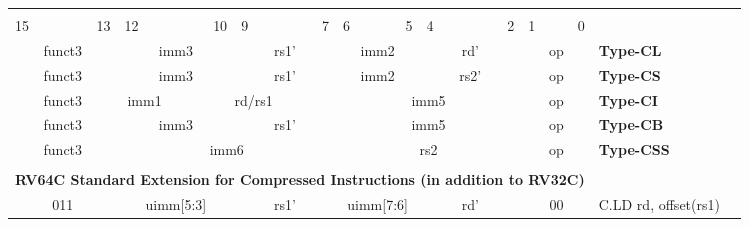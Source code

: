 \documentclass{report}
\begin{document}
\begin{table}[p]
\begin{small}
\begin{center}
\begin{tabular}{p{0.05mm}p{0.05mm}p{0.05mm}p{0.05mm}p{0.05mm}p{0.05mm}p{0.05mm}p{0.05mm}p{0.05mm}p{0.05mm}p{0.05mm}p{0.05mm}p{0.05mm}p{0.05mm}p{0.05mm}p{0.05mm}p{0.05mm}p{0.05mm}p{0.05mm}p{0.05mm}p{0.05mm}p{0.05mm}p{0.05mm}p{0.05mm}p{0.05mm}p{0.05mm}p{0.05mm}p{0.05mm}p{0.05mm}p{0.05mm}p{0.05mm}p{0.05mm}p{50mm}l}& & & & & & & & & & & & & & & & & & & & & & & & & & & & & & & & & \\
\multicolumn{1}{l}{\scriptsize{15}} & \multicolumn{5}{r}{\scriptsize{13}} & \multicolumn{1}{l}{\scriptsize{12}} & \multicolumn{5}{r}{\scriptsize{10}} & \multicolumn{1}{l}{\scriptsize{9}} & \multicolumn{5}{r}{\scriptsize{7}} & \multicolumn{1}{l}{\scriptsize{6}} & \multicolumn{3}{r}{\scriptsize{5}} & \multicolumn{1}{l}{\scriptsize{4}} & \multicolumn{5}{r}{\scriptsize{2}} & \multicolumn{1}{l}{\scriptsize{1}} & \multicolumn{3}{r}{\scriptsize{0}} &  \\
\cline{1-32}
\multicolumn{6}{|c|}{funct3} & \multicolumn{6}{c|}{imm3} & \multicolumn{6}{c|}{rs1'} & \multicolumn{4}{c|}{imm2} & \multicolumn{6}{c|}{rd'} & \multicolumn{4}{c|}{op} & \scriptsize{\bf Type-CL} \\
\cline{1-32}
\multicolumn{6}{|c|}{funct3} & \multicolumn{6}{c|}{imm3} & \multicolumn{6}{c|}{rs1'} & \multicolumn{4}{c|}{imm2} & \multicolumn{6}{c|}{rs2'} & \multicolumn{4}{c|}{op} & \scriptsize{\bf Type-CS} \\
\cline{1-32}
\multicolumn{6}{|c|}{funct3} & \multicolumn{2}{c|}{imm1} & \multicolumn{10}{c|}{rd/rs1} & \multicolumn{10}{c|}{imm5} & \multicolumn{4}{c|}{op} & \scriptsize{\bf Type-CI} \\
\cline{1-32}
\multicolumn{6}{|c|}{funct3} & \multicolumn{6}{c|}{imm3} & \multicolumn{6}{c|}{rs1'} & \multicolumn{10}{c|}{imm5} & \multicolumn{4}{c|}{op} & \scriptsize{\bf Type-CB} \\
\cline{1-32}
\multicolumn{6}{|c|}{funct3} & \multicolumn{12}{c|}{imm6} & \multicolumn{10}{c|}{rs2} & \multicolumn{4}{c|}{op} & \scriptsize{\bf Type-CSS} \\
\cline{1-32}
\tabularnewline
\multicolumn{32}{c}{\bf RV64C Standard Extension for Compressed Instructions (in addition to RV32C) } & \\
\cline{1-32}
\multicolumn{6}{|c|}{011} & \multicolumn{6}{c|}{uimm[5:3]} & \multicolumn{6}{c|}{rs1'} & \multicolumn{4}{c|}{uimm[7:6]} & \multicolumn{6}{c|}{rd'} & \multicolumn{4}{c|}{00} & \scriptsize{C.LD rd, offset(rs1)} \\

\end{tabular}
\end{center}
\end{small}
\end{table}
\end{document}
